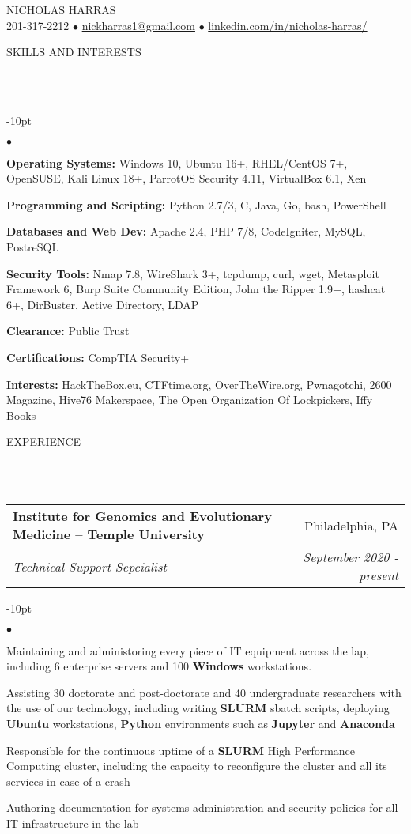 \documentclass[12pt]{article}
\makeatletter
\newcommand{\mailto}[1]{
	\href{mailto:#1}{#1}
}
\newcommand{\contact}[2]{
	\vspace*{-8pt}
	\begin{center}
		{#1}\\ %
		#2
	\end{center}
	\vspace*{-12pt}
}
\newcommand{\header}[1]{
	\vspace*{12pt} %
	{\hspace*{-14pt}\vspace*{6pt} #1}
	\vspace*{-6pt} 
	\lineunder
}
\newcommand{\lineunder}{
	\vspace*{-8pt} \\ 
	\hspace*{-18pt} 
	\hrulefill \\
}
\newcommand{\subheading}[4]{
 	\vspace{5pt}
    	\begin{tabular*}{1.01\textwidth}
    		{l@{\extracolsep{\fill}}r}
      		\hspace{-16pt}\textbf{#1} & #2 \\
      		\hspace{-16pt}\textit{\small#3} & \textit{\small #4} \\
    	\end{tabular*}
    \vspace{-4pt}
}
\newenvironment{achievements}{
\begin{adjustwidth}{-10pt}{}
  \begin{list}{$\bullet$}{
  	\topsep 0pt \itemsep -4pt}}
  	{\vspace*{2pt}\end{list}
\end{adjustwidth}
}
\makeatother
\begin{document}
\small
\smallskip
\vspace*{-40pt}

\contact{\huge{N}\LARGE{ICHOLAS} \huge{H}\LARGE{ARRAS}}{201-317-2212 $\bullet$ \mailto{nickharras1@gmail.com} $\bullet$ \href{https://www.github.com/harras}{linkedin.com/in/nicholas-harras/}}


\vspace{-8pt}
\header{SKILLS AND INTERESTS}
	\begin{achievements}
		\item{\bf Operating Systems:} Windows 10, Ubuntu 16+, RHEL/CentOS 7+, OpenSUSE, Kali Linux 18+, ParrotOS Security 4.11, VirtualBox 6.1, Xen
		\item{\bf Programming and Scripting:} Python 2.7/3, C, Java, Go, bash, PowerShell
		\item{\bf Databases and Web Dev:} Apache 2.4, PHP 7/8, CodeIgniter, MySQL, PostreSQL
		\item{\bf Security Tools:} Nmap 7.8, WireShark 3+, tcpdump, curl, wget, Metasploit Framework 6, Burp Suite Community Edition, John the Ripper 1.9+, hashcat 6+, DirBuster, Active Directory, LDAP
		\item{\bf Clearance:} Public Trust
		\item{\bf Certifications:} CompTIA Security+
		\item{\bf Interests:} HackTheBox.eu, CTFtime.org, OverTheWire.org, Pwnagotchi, 2600 Magazine, Hive76 Makerspace, The Open Organization Of Lockpickers, Iffy Books
	\end{achievements}

\vspace{-8pt}
\header{EXPERIENCE}

\subheading
	{Institute for Genomics and Evolutionary Medicine -- Temple University}{Philadelphia, PA}
	{Technical Support Sepcialist}{September 2020 - present}
	\begin{achievements}
		\item Maintaining and administoring every piece of IT equipment across the lap, including 6 enterprise servers and 100 \textbf{Windows} workstations. 
		\item Assisting 30 doctorate and post-doctorate and 40 undergraduate researchers with the use of our technology, including writing \textbf{SLURM} sbatch scripts, deploying \textbf{Ubuntu} workstations, \textbf{Python} environments such as \textbf{Jupyter} and \textbf{Anaconda}
		\item Responsible for the continuous uptime of a \textbf{SLURM} High Performance Computing cluster, including the capacity to reconfigure the cluster and all its services in case of a crash
		\item Authoring documentation for systems administration and security policies for all IT infrastructure in the lab
	\end{achievements}
\end{document}
